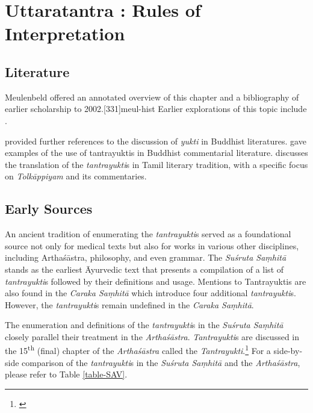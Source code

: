 
\chapter{Uttaratantra :  Rules of Interpretation}

\section{Literature} 

Meulenbeld offered an annotated overview of this chapter and a bibliography
of earlier scholarship to 2002.[331]{meul-hist}  Earlier explorations 
of this topic include \cite{dasg-1952,
lele-1981,
mejo-2000,
nara-1949,
ober-1967,
scha-1993,
sing-2003,
muth-1976}. 


\citet[105--106, fn.\,109]{prei-2013} provided further references to the
discussion of \emph{yukti} in Buddhist literatures. \citet{mane-2008}
gave examples of the use of tantrayuktis in Buddhist commentarial
literature. \citet{chev-2009} discusses the translation of the \emph{tantrayukti}s in Tamil literary tradition, with a specific focus on \emph{Tolkāppiyam} and its commentaries.


\section{Early Sources}

An ancient tradition of enumerating the \emph{tantrayukti}s served as a foundational source not only for medical texts but also for works in various other disciplines, including Arthaśāstra, philosophy, and even grammar. The \emph{Suśruta Saṃhitā} stands as the earliest Āyurvedic text that presents a compilation of a list of \emph{tantrayukti}s followed by their definitions and usage. Mentions to Tantrayuktis are also found in the \emph{Caraka Saṃhitā}  which introduce four additional \emph{tantrayukti}s. However, the \emph{tantrayukti}s remain undefined in the \emph{Caraka Saṃhitā}. 

The enumeration and definitions of the \emph{tantrayukti}s in the \emph{Suśruta Saṃhitā} closely parallel their treatment in the \emph{Arthaśāstra}. \emph{Tantrayukti}s are discussed in the 15\textsuperscript{th} (final) chapter of the \emph{Arthaśāstra} called the \emph{Tantrayukti}.\footnote{\cite[280--283]{kang-1960}} For a side-by-side comparison of the \emph{tantrayukti}s in the \emph{Suśruta Saṃhitā} and the \emph{Arthaśāstra}, please refer to Table \ref{table-SAV}.

